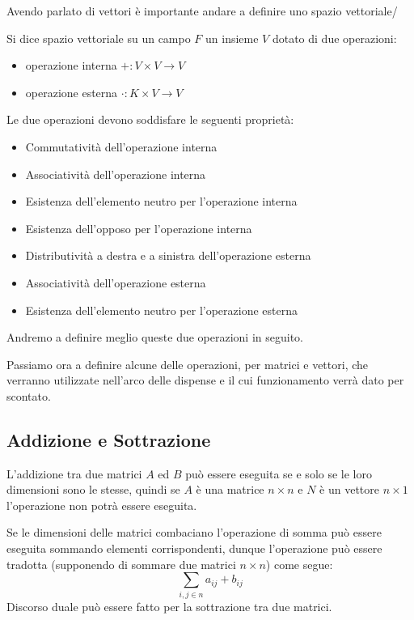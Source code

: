 Avendo parlato di vettori è importante andare a definire uno spazio vettoriale/
\begin{definition}
    Si dice spazio vettoriale su un campo $F$ un insieme $V$ dotato di due operazioni:
    \begin{itemize}
        \item operazione interna $+ : V \times V \rightarrow V$
        \item operazione esterna $\cdot : K \times V \rightarrow V$
    \end{itemize}
    Le due operazioni devono soddisfare le seguenti proprietà:
    \begin{itemize}
        \item Commutatività dell'operazione interna
        \item Associatività dell'operazione interna
        \item Esistenza dell'elemento neutro per l'operazione interna
        \item Esistenza dell'opposo per l'operazione interna
        \item Distributività a destra e a sinistra dell'operazione esterna
        \item Associatività dell'operazione esterna
        \item Esistenza dell'elemento neutro per l'operazione esterna
    \end{itemize}
    Andremo a definire meglio queste due operazioni in seguito.
\end{definition}
Passiamo ora a definire alcune delle operazioni, per matrici e vettori, che verranno utilizzate nell'arco delle dispense e il cui funzionamento verrà dato per scontato.
\subsection{Addizione e Sottrazione}
L'addizione tra due matrici $A$ ed $B$ può essere eseguita se e solo se le loro dimensioni sono le stesse, quindi se $A$ è una matrice $n \times n$ e $N$ è un vettore $n \times 1$ l'operazione non potrà essere eseguita.

Se le dimensioni delle matrici combaciano l'operazione di somma può essere eseguita sommando elementi corrispondenti, dunque l'operazione può essere tradotta (supponendo di sommare due matrici $n \times n$) come segue:
\begin{equation*}
    \sum_{i, j \in n} a_{ij} + b_{ij}
\end{equation*}
Discorso duale può essere fatto per la sottrazione tra due matrici.
